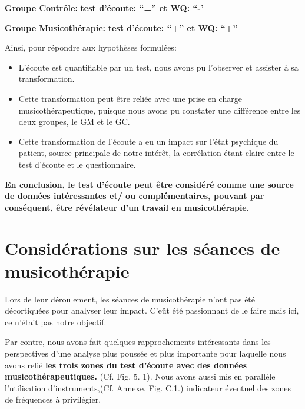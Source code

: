   \textbf{Groupe Contrôle:} 	          \textbf{ test d'écoute: ``=''   et    WQ: ``-'}


  \textbf{Groupe Musicothérapie:}     \textbf{test d'écoute: ``+''      et    WQ: ``+''}



  Ainsi, pour répondre aux hypothèses formulées:
  \begin{itemize}
       \item
          L'écoute est quantifiable  par un test, nous avons pu l'observer et   assister à sa
  transformation.

  \item Cette transformation peut être reliée  avec
  une prise en charge musicothérapeutique, puisque nous avons pu constater une différence entre les deux groupes, le GM et le GC.

  \item Cette transformation de l'écoute a eu  un impact sur l'état
  psychique du patient, source principale de notre intérêt, la corrélation étant claire entre le test d'écoute et le questionnaire.
  \end{itemize}

  \textbf{ En conclusion, le test
  d'écoute peut être considéré comme une source de données
   intéressantes et/ ou complémentaires, pouvant par conséquent, être
  \textbf{révélateur d'un
  travail en musicothérapie}}.





\section{Considérations sur les séances de musicothérapie}
              Lors de leur déroulement, les séances de
              musicothérapie n'ont pas été
décortiquées pour analyser leur impact. C'eût
été passionnant de le faire mais ici, ce n'était pas notre objectif.


Par contre, nous avons fait quelques rapprochements intéressants dans les perspectives d'une analyse plus
poussée et plus importante pour laquelle nous avons  relié\textbf{ les trois zones du
test d'écoute avec des données musicothérapeutiques.}
(Cf. Fig. 5. 1).
Nous avons aussi mis
en parallèle  l'utilisation d'instruments,(Cf. Annexe, Fig. C.1.)
indicateur éventuel des zones de fréquences à
privilégier.

